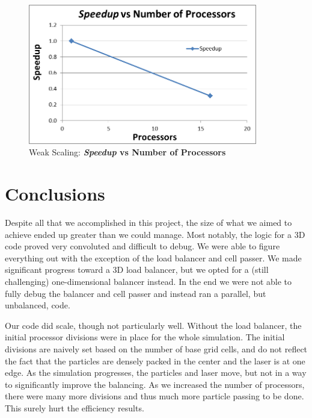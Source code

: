 \documentclass[]{article}
\begin{document}
\begin{figure}[h!]
    \centering
    \includegraphics[width=10cm]{weak_speedup.png}
    \caption{Weak Scaling: \textbf{\textit{Speedup} vs Number of Processors}}
\end{figure}




\section{Conclusions}
Despite all that we accomplished in this project, the size of what we aimed to achieve ended up greater than we could manage. Most notably, the logic for a 3D code proved very convoluted and difficult to debug.  We were able to figure everything out with the exception of the load balancer and cell passer.  We made significant progress toward a 3D load balancer, but we opted for a (still challenging) one-dimensional balancer instead.  In the end we were not able to fully debug the balancer and cell passer and instead ran a parallel, but unbalanced, code.

Our code did scale, though not particularly well.  Without the load balancer, the initial processor divisions were in place for the whole simulation.  The initial divisions are naively set based on the number of base grid cells, and do not reflect the fact that the particles are densely packed in the center and the laser is at one edge.  As the simulation progresses, the particles and laser move, but not in a way to significantly improve the balancing.  As we increased the number of processors, there were many more divisions and thus much more particle passing to be done.  This surely hurt the efficiency results.
\end{document}
